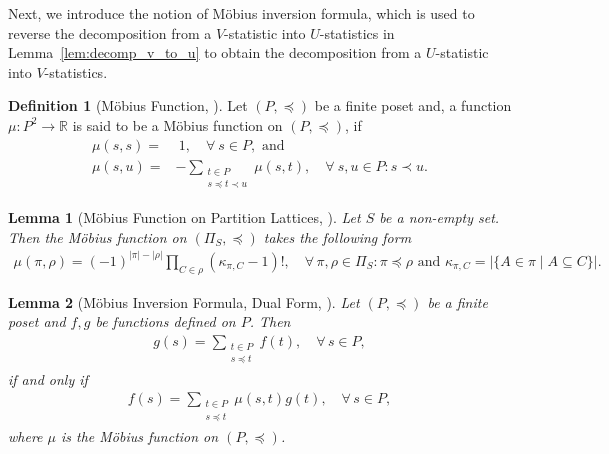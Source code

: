 \documentclass[12pt]{article}
\theoremstyle{plain}
\newtheorem{lemma}{Lemma}
\theoremstyle{definition}
\newtheorem{definition}{Definition}
\newcommand{\mobius}{M\"obius}
\newcommand{\sPi}{\pi}
\newcommand{\partition}{\Pi}
\newcommand{\partitionp}[1]{\partition_{#1}}
\newcommand{\pleq}{\preceq}
\newcommand{\reals}{{\mathbb{R}}}
\begin{document}
\begin{bibunit}[agsm]
Next, we introduce the notion of \mobius{} inversion formula, which is used to reverse the decomposition from a $V$-statistic into $U$-statistics in Lemma~\ref{lem:decomp_v_to_u} to obtain the decomposition from a $U$-statistic into $V$-statistics.

\begin{definition}[\mobius{} Function, \cite{stanley2011enumerative}]\label{def:mobius_func}
    Let $(P, \preceq)$ be a finite poset and, a function $\mu: P^2 \to \reals$ is said to be a \mobius{} function on $(P, \preceq)$, if
    \begin{align*}
        \mu(s,s) = & \ 1, \quad \forall \ s \in P, \text{ and} \\
        \mu(s,u) = & - \sum_{\substack{t \in P \\ s \preceq t \prec u}} \mu(s,t), \quad \forall \ s, u \in P: s \prec u.
    \end{align*}
\end{definition}

\begin{lemma}[\mobius{} Function on Partition Lattices, \cite{stanley2011enumerative}]\label{lem:mobius_func_partition}
Let $S$ be a non-empty set. Then the \mobius{} function on $(\partitionp{S}, \pleq)$ takes the following form
\begin{align*}
    \mu(\sPi, \rho) = (-1)^{|\sPi|-|\rho|} \prod_{C \in \rho} (\kappa_{\sPi, C} - 1)!, \quad \forall \, \sPi,\rho \in \partitionp{S}: \sPi \pleq \rho \text{ and } \kappa_{\sPi, C} = |\{ A \in \sPi \mid A \subseteq C \}|.
\end{align*}
\end{lemma}

\begin{lemma}[\mobius{} Inversion Formula, Dual Form,  \cite{stanley2011enumerative}]\label{lem:mobius_formula_dual}
    Let $(P, \preceq)$ be a finite poset and $f, g$ be functions defined on $P$. Then
    \begin{align*}
        g(s) = \sum_{\substack{t \in P \\ s \preceq t}}f(t), \quad \forall \, s \in P,
    \end{align*}
    if and only if
    \begin{align*}
        f(s) = \sum_{\substack{t \in P \\ s \preceq t}} \mu(s,t)g(t), \quad \forall \, s \in P, 
    \end{align*}
    where $\mu$ is the \mobius{} function on $(P, \preceq)$. 
\end{lemma}


\end{bibunit}
\end{document}

